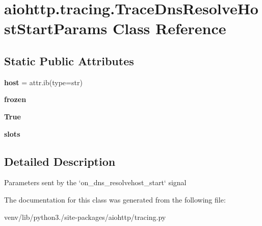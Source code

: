 \hypertarget{classaiohttp_1_1tracing_1_1_trace_dns_resolve_host_start_params}{}\section{aiohttp.\+tracing.\+Trace\+Dns\+Resolve\+Host\+Start\+Params Class Reference}
\label{classaiohttp_1_1tracing_1_1_trace_dns_resolve_host_start_params}
\subsection*{Static Public Attributes}
\begin{DoxyCompactItemize}
\item 
\mbox{\label{classaiohttp_1_1tracing_1_1_trace_dns_resolve_host_start_params_a8d8dddc87d915c035084615202303238}} 
{\bfseries host} = attr.\+ib(type=str)
\item 
\mbox{\label{classaiohttp_1_1tracing_1_1_trace_dns_resolve_host_start_params_a4fbe3ef1d72fc523e5436e6fdf5a527d}} 
{\bfseries frozen}
\item 
\mbox{\label{classaiohttp_1_1tracing_1_1_trace_dns_resolve_host_start_params_a6990a7857f9930a6ffc305581deef77c}} 
{\bfseries True}
\item 
\mbox{\label{classaiohttp_1_1tracing_1_1_trace_dns_resolve_host_start_params_ab32c15f8e792b300a34aa03b4c86bab5}} 
{\bfseries slots}
\end{DoxyCompactItemize}


\subsection{Detailed Description}
\begin{DoxyVerb}Parameters sent by the `on_dns_resolvehost_start` signal\end{DoxyVerb}
 

The documentation for this class was generated from the following file\+:\begin{DoxyCompactItemize}
\item 
venv/lib/python3./site-\/packages/aiohttp/tracing.\+py\end{DoxyCompactItemize}
